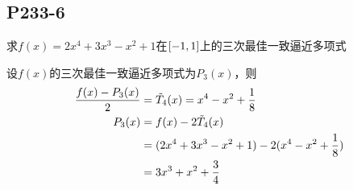 \subsection{P233-6}
\renewcommand{\FX}{2 x^4 + 3 x^3 - x^2 + 1}
\renewcommand{\LRANGE}{-1}
\renewcommand{\RRANGE}{1}
求$f(x) = \FX$在$\RANGE$上的三次最佳一致逼近多项式
\begin{SOLVE}
设$f(x)$的三次最佳一致逼近多项式为$P_3(x)$，则
\begin{align*}
\frac{f(x) - P_3(x)}{2} & = \Tilde{T}_4(x) = x^4 - x^2 + \frac{1}{8}\\
P_3(x)                  & = f(x) - 2 \Tilde{T}_4(x)\\
                        & = (\FX) - 2 (x^4 - x^2 + \frac{1}{8})\\
                        & = 3 x^3 + x^2 + \frac{3}{4} \\
\end{align*}
\end{SOLVE}